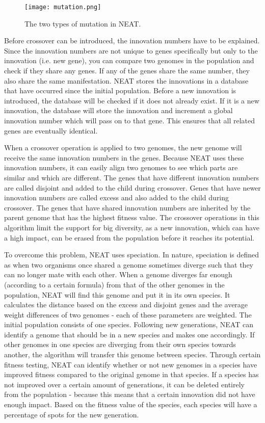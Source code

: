 \begin{figure}[H]
\centering
\texttt{[image: mutation.png]}
\caption{The two types of mutation in NEAT.}
\label{fig:mut}
\end{figure}

Before crossover can be introduced, the innovation numbers have to be explained.
Since the innovation numbers are not unique to genes specifically but only to the innovation (i.e. new gene), you can compare two genomes in the population and check if they share any genes.
If any of the genes share the same number, they also share the same manifestation. 
NEAT stores the innovations in a database that have occurred since the initial population.
Before a new innovation is introduced, the database will be checked if it does not already exist.
If it is a new innovation, the database will store the innovation and increment a global innovation number which will pass on to that gene.
This ensures that all related genes are eventually identical.

When a crossover operation is applied to two genomes, the new genome will receive the same innovation numbers in the genes.
Because NEAT uses these innovation numbers, it can easily align two genomes to see which parts are similar and which are different.
The genes that have different innovation numbers are called disjoint and added to the child during crossover.
Genes that have newer innovation numbers are called excess and also added to the child during crossover.
The genes that have shared innovation numbers are inherited by the parent genome that has the highest fitness value.
The crossover operations in this algorithm limit the support for big diversity, as a new innovation, which can have a high impact, can be erased from the population before it reaches its potential.

To overcome this problem, NEAT uses speciation.
In nature, speciation is defined as when two organisms once shared a genome sometimes diverge such that they can no longer mate with each other.
When a genome diverges far enough (according to a certain formula) from that of the other genomes in the population, NEAT will find this genome and put it in its own species.
It calculates the distance based on the excess and disjoint genes and the average weight differences of two genomes - each of these parameters are weighted.
The initial population consists of one species.
Following new generations, NEAT can identify a genome that should be in a new species and makes one accordingly.
If other genomes in one species are diverging from their own species towards another, the algorithm will transfer this genome between species.
Through certain fitness testing, NEAT can identify whether or not new genomes in a species have improved fitness compared to the original genome in that species.
If a species has not improved over a certain amount of generations, it can be deleted entirely from the population - because this means that a certain innovation did not have enough impact.
Based on the fitness value of the species, each species will have a percentage of spots for the new generation.

